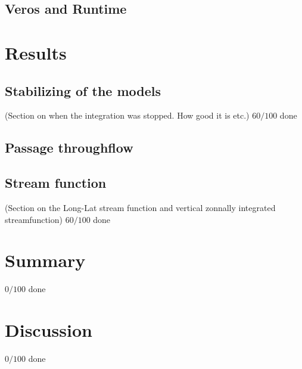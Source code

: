\documentclass[a4paper]{article}
\begin{document}
\begin{multicols}{2}




\subsection{Veros and Runtime}


\section{Results}
\subsection{Stabilizing of the models}
(Section on when the integration was stopped. How good it is etc.)
$60/100$ done


\subsection{Passage throughflow}


\subsection{Stream function}

(Section on the Long-Lat stream function and vertical zonnally integrated streamfunction)
$60/100$ done
\section{Summary}
%
$0/100$ done

\section{Discussion}
%
$0/100$ done


%

\printbibliography

\end{multicols}
\end{document}
